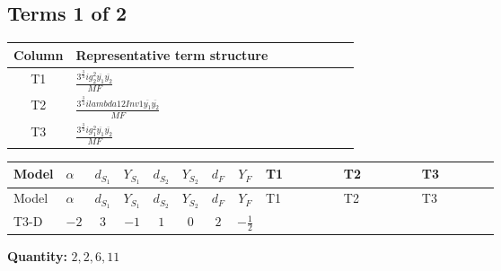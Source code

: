 \documentclass[8pt]{article}
\begin{document}
\begin{landscape}
\subsection*{Terms 1 of 2}
\begin{center}
\begin{tabular}{@{}c >{\raggedright\arraybackslash}p{0.82\linewidth}@{}}
\toprule
Column & Representative term structure \\
\midrule
T1 & \(\displaystyle \frac{3^{\frac{3}{4}} i g_{2}^{2} \overline{y_{1}} \overline{y_{2}}}{MF}\) \\
\midrule
T2 & \(\displaystyle \frac{3^{\frac{3}{4}} i lambda12Inv1 \overline{y_{1}} \overline{y_{2}}}{MF}\) \\
\midrule
T3 & \(\displaystyle \frac{3^{\frac{3}{4}} i g_{1}^{2} \overline{y_{1}} \overline{y_{2}}}{MF}\) \\
\midrule
\bottomrule
\end{tabular}
\end{center}
\smallskip
\tiny
\begin{longtable}{@{}llcccccc >{\raggedright\arraybackslash}p{0.21\linewidth} >{\raggedright\arraybackslash}p{0.21\linewidth} >{\raggedright\arraybackslash}p{0.21\linewidth}@{}}
\toprule
Model & $\alpha$ & $d_{S_1}$ & $Y_{S_1}$ & $d_{S_2}$ & $Y_{S_2}$ & $d_F$ & $Y_F$ & T1 & T2 & T3 \\
\midrule
\endfirsthead
\toprule
Model & $\alpha$ & $d_{S_1}$ & $Y_{S_1}$ & $d_{S_2}$ & $Y_{S_2}$ & $d_F$ & $Y_F$ & T1 & T2 & T3 \\
\midrule
\endhead
T3-D & $-2$ & $3$ & $-1$ & $1$ & $0$ & $2$ & $-\frac{1}{2}$ & \scriptsize\adjustbox{max width=\linewidth}{$\begin{gathered} - \frac{11 \cdot 3^{\frac{3}{4}} i g_{2}^{2} \overline{y_{1}} \overline{y_{2}}}{8 MF}\end{gathered}$} & \scriptsize\adjustbox{max width=\linewidth}{$\begin{gathered} - \frac{3^{\frac{3}{4}} i lambda12Inv1 \overline{y_{1}} \overline{y_{2}}}{6 MF}\end{gathered}$} & \scriptsize\adjustbox{max width=\linewidth}{$\begin{gathered} - \frac{3^{\frac{3}{4}} i g_{1}^{2} \overline{y_{1}} \overline{y_{2}}}{8 MF}\end{gathered}$} \\
\midrule
\bottomrule
\end{longtable}
\clearpage
\noindent\textbf{Quantity: }$\mathrm{2,2,6,11}$\par\smallskip

\end{landscape}
\end{document}
